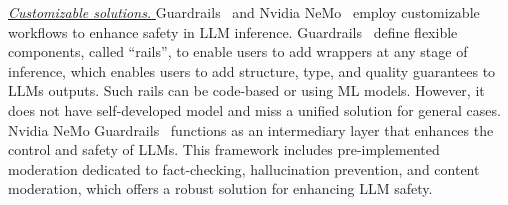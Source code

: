 \underline{\textit{Customizable solutions. }}
Guardrails~\citep{guardrails} and Nvidia NeMo~\citep{nemo} employ customizable workflows to enhance safety in LLM inference. 
Guardrails~\citep{guardrails} define flexible components, called ``rails'', to enable users to add wrappers at any stage of inference, which enables  users to add structure, type, and quality guarantees to LLMs outputs. Such rails can be code-based or using ML models. However, it does not have self-developed model and miss a unified solution for general cases. 
Nvidia NeMo Guardrails~\citep{nemo} functions as an intermediary layer that enhances the control and safety of LLMs. 
This framework includes pre-implemented moderation dedicated to fact-checking, hallucination prevention, and content moderation, which offers a robust solution for enhancing LLM safety.

